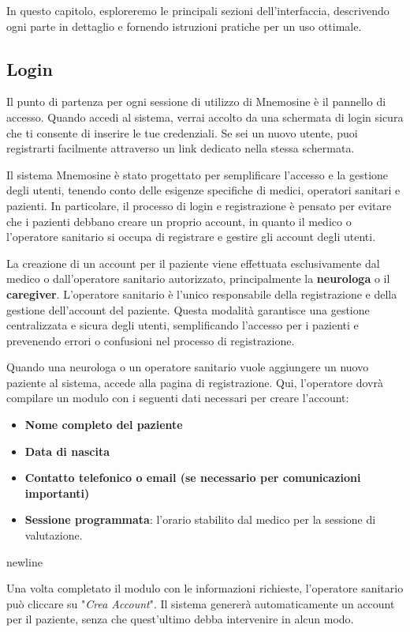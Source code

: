 \documentclass[a4paper,12pt]{book}
\begin{document}
	In questo capitolo, esploreremo le principali sezioni dell'interfaccia, descrivendo ogni parte in dettaglio e fornendo istruzioni pratiche per un uso ottimale.
	
	\subsection{Login}
	Il punto di partenza per ogni sessione di utilizzo di Mnemosine è il pannello di accesso. Quando accedi al sistema, verrai accolto da una schermata di login sicura che ti consente di inserire le tue credenziali. Se sei un nuovo utente, puoi registrarti facilmente attraverso un link dedicato nella stessa schermata.
	
	Il sistema Mnemosine è stato progettato per semplificare l'accesso e la gestione degli utenti, tenendo conto delle esigenze specifiche di medici, operatori sanitari e pazienti. In particolare, il processo di login e registrazione è pensato per evitare che i pazienti debbano creare un proprio account, in quanto il medico o l'operatore sanitario si occupa di registrare e gestire gli account degli utenti.
	
	La creazione di un account per il paziente viene effettuata esclusivamente dal medico o dall'operatore sanitario autorizzato, principalmente la \textbf{neurologa} o il \textbf{caregiver}. L'operatore sanitario è l'unico responsabile della registrazione e della gestione dell'account del paziente. Questa modalità garantisce una gestione centralizzata e sicura degli utenti, semplificando l'accesso per i pazienti e prevenendo errori o confusioni nel processo di registrazione.

	Quando una neurologa o un operatore sanitario vuole aggiungere un nuovo paziente al sistema, accede alla pagina di registrazione. Qui, l'operatore dovrà compilare un modulo con i seguenti dati necessari per creare l'account:
	\begin{itemize}
		\item \textbf{Nome completo del paziente}
		\item \textbf{Data di nascita}
		\item \textbf{Contatto telefonico o email (se necessario per comunicazioni importanti)}
		\item \textbf{Sessione programmata}: l'orario stabilito dal medico per la sessione di valutazione.
	\end{itemize}newline
	
	Una volta completato il modulo con le informazioni richieste, l'operatore sanitario può cliccare su "\textit{Crea Account}". Il sistema genererà automaticamente un account per il paziente, senza che quest'ultimo debba intervenire in alcun modo.
	
\end{document}
